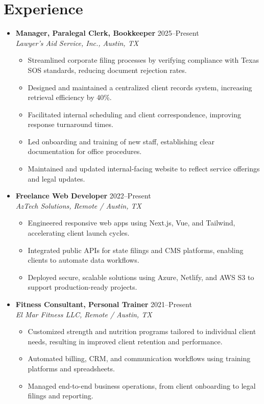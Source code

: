 \documentclass[letterpaper,10pt]{article}
\newcommand{\resumeItem}[1]{\item\small{#1}}
\begin{document}
\section*{Experience}
\begin{itemize}[leftmargin=0.15in]
  \item
    \textbf{Manager, Paralegal Clerk, Bookkeeper} \hfill 2025–Present \\
    \textit{Lawyer's Aid Service, Inc., Austin, TX}
    \begin{itemize}
      \resumeItem{Streamlined corporate filing processes by verifying compliance with Texas SOS standards, reducing document rejection rates.}
      \resumeItem{Designed and maintained a centralized client records system, increasing retrieval efficiency by 40\%.}
      \resumeItem{Facilitated internal scheduling and client correspondence, improving response turnaround times.}
      \resumeItem{Led onboarding and training of new staff, establishing clear documentation for office procedures.}
      \resumeItem{Maintained and updated internal-facing website to reflect service offerings and legal updates.}
    \end{itemize}

  \item
    \textbf{Freelance Web Developer} \hfill 2022–Present \\
    \textit{AzTech Solutions, Remote / Austin, TX}
    \begin{itemize}
      \resumeItem{Engineered responsive web apps using Next.js, Vue, and Tailwind, accelerating client launch cycles.}
      \resumeItem{Integrated public APIs for state filings and CMS platforms, enabling clients to automate data workflows.}
      \resumeItem{Deployed secure, scalable solutions using Azure, Netlify, and AWS S3 to support production-ready projects.}
    \end{itemize}

  \item
    \textbf{Fitness Consultant, Personal Trainer} \hfill 2021–Present \\
    \textit{El Mar Fitness LLC, Remote / Austin, TX}
    \begin{itemize}
      \resumeItem{Customized strength and nutrition programs tailored to individual client needs, resulting in improved client retention and performance.}
      \resumeItem{Automated billing, CRM, and communication workflows using training platforms and spreadsheets.}
      \resumeItem{Managed end-to-end business operations, from client onboarding to legal filings and reporting.}
    \end{itemize}
\end{itemize}
\end{document}
